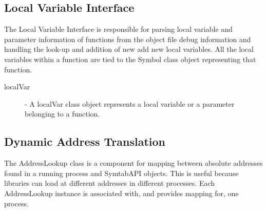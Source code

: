 \subsection{Local Variable Interface}
The Local Variable Interface is responsible for parsing local variable and parameter information of functions from the object file debug information and handling the look-up and addition of new add new local variables. All the local variables within a function are tied to the Symbol class object representing that function.
\begin{description}
\item[localVar] - A localVar class object represents a local variable or a parameter belonging to a function.
\end{description}

\subsection{Dynamic Address Translation}
The AddressLookup class is a component for mapping between absolute addresses found in a running process and SymtabAPI objects. This is useful because libraries can load at different addresses in different processes. Each AddressLookup instance is associated with, and provides mapping for, one process.

